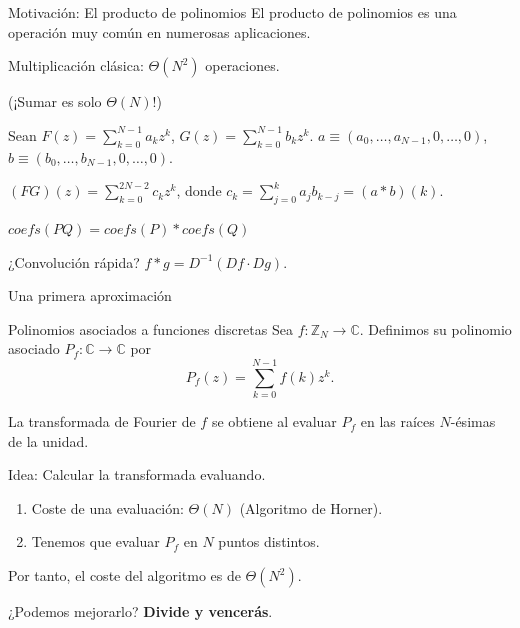 \documentclass[11pt,compress]{beamer}
\newcommand\C{\mathbb{C}}
\newcommand\Z{\mathbb{Z}}
\begin{document}
\begin{frame}{Motivación: El producto de polinomios}
    El producto de polinomios es una operación muy común en numerosas aplicaciones.
    \begin{tcolorbox}[colback=ChetwodeBlue!10,colframe=ChetwodeBlue!60]
  \begin{center}
    {\color{TurkishRose}Multiplicación clásica: $\Theta(N^2)$ operaciones.}
    
    {\color{TurkishRose} (¡Sumar es solo $\Theta(N)$!)}
  \end{center}
  \end{tcolorbox}
  
  Sean $F(z) = \sum_{k=0}^{N-1}a_kz^k$, $G(z) = \sum_{k=0}^{N-1}b_kz^k$.
  $a \equiv (a_0,\dots,a_{N-1},0,\dots,0)$, $b \equiv (b_0,\dots,b_{N-1},0,\dots,0)$.
  
  $(FG)(z) = \sum_{k=0}^{2N-2} c_kz^k$, donde $c_k = \sum_{j=0}^{k}a_jb_{k-j} = (a \ast b)(k)$.
  
  \begin{tcolorbox}[colback=ChetwodeBlue!10,colframe=ChetwodeBlue!60]
  \begin{center}
    {\color{TurkishRose} $coefs(PQ) = coefs(P) \ast coefs(Q)$}
  \end{center}
  \end{tcolorbox}
  
  ¿Convolución rápida? $f \ast g = D^{-1}(Df \cdot Dg)$.
  
\end{frame}

\begin{frame}{Una primera aproximación}

\begin{block}{Polinomios asociados a funciones discretas}
    Sea $f\colon \Z_N \to \C$. Definimos su polinomio asociado $P_f\colon \C \to \C$ por
    \[ P_f(z) = \sum_{k=0}^{N-1}f(k)z^k. \]
\end{block}
La transformada de Fourier de $f$ se obtiene al evaluar $P_f$ en las raíces $N$-ésimas de la unidad.

\begin{alertblock}{Idea: Calcular la transformada evaluando.}
    \begin{enumerate}
        \item Coste de una evaluación: $\Theta(N)$ (Algoritmo de Horner).
        \item Tenemos que evaluar $P_f$ en $N$ puntos distintos.
    \end{enumerate}
    Por tanto, el coste del algoritmo es de $\Theta(N^2)$.
\end{alertblock}

¿Podemos mejorarlo? \textbf{Divide y vencerás}.

\end{frame}
\end{document}

